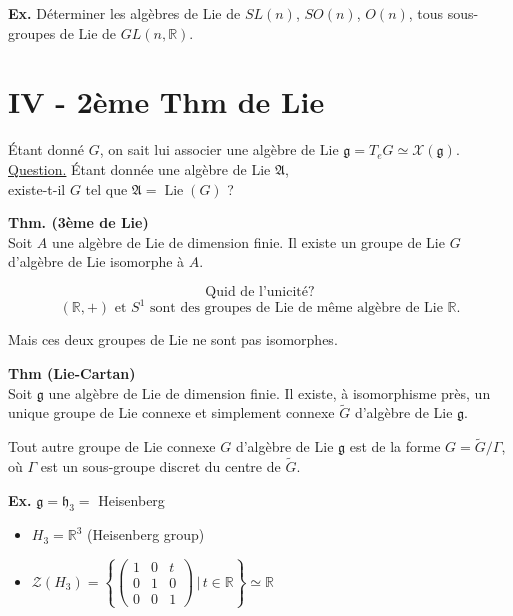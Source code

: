 \documentclass[11pt,a4paper]{article}
\begin{document}
\textbf{Ex.} Déterminer les algèbres de Lie de \( SL(n) \), \( SO(n) \), \( O(n) \), tous sous-groupes de Lie de \( GL(n, \mathbb{R}) \).

\section*{IV - 2\`eme Thm de Lie}

Étant donné \( G \), on sait lui associer une algèbre de Lie \(\mathfrak{g} = T_e G \simeq \mathcal{X}(\mathfrak{g})\). \\

\underline{Question.} Étant donnée une algèbre de Lie \( \mathfrak{A} \), \\
existe-t-il \( G \) tel que \( \mathfrak{A} = \operatorname{Lie}(G) \) ?

\textbf{Thm. (3ème de Lie)} \\
Soit $A$ une algèbre de Lie de dimension finie. Il existe un groupe de Lie $G$ d'algèbre de Lie isomorphe à $A$.

\[
\text{Quid de l'unicité?}
\]
\[
(\mathbb{R}, +) \text{ et } S^1 \text{ sont des groupes de Lie de même algèbre de Lie } \mathbb{R}.
\]

Mais ces deux groupes de Lie ne sont pas isomorphes.

\bigskip

\textbf{Thm (Lie-Cartan)} \\
Soit $\mathfrak{g}$ une algèbre de Lie de dimension finie. Il existe, à isomorphisme près, un unique groupe de Lie connexe et simplement connexe $\tilde{G}$ d'algèbre de Lie $\mathfrak{g}$.

Tout autre groupe de Lie connexe $G$ d'algèbre de Lie $\mathfrak{g}$ est de la forme $G = \tilde{G} / \Gamma$,\\
où $\Gamma$ est un sous-groupe discret du centre de $\tilde{G}$.

\bigskip

\textbf{Ex.} $\mathfrak{g} = \mathfrak{h}_3 = $ Heisenberg

\begin{itemize}
	\item $H_3 = \mathbb{R}^3$ \hspace{0.5cm} (Heisenberg group)
	\item $\mathcal{Z}(H_3) = \left\{
	\begin{pmatrix}
		1 & 0 & t \\
		0 & 1 & 0 \\
		0 & 0 & 1
	\end{pmatrix}
	\,\Bigg|\,
	t \in \mathbb{R}
	\right\}\simeq \mathbb{R}$
\end{itemize}
\end{document}
